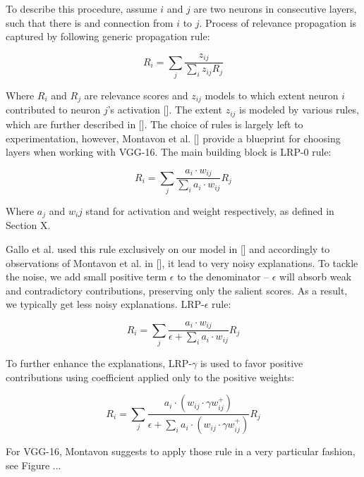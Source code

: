To describe this procedure, assume $i$ and $j$ are two neurons in consecutive layers, such that there is and connection from $i$ to $j$. Process of relevance propagation is captured by following generic propagation rule:

\begin{equation}
    R_i = \sum_j \frac{z_{ij}}{\sum_i z_{ij} R_j}
\end{equation}

Where $R_i$ and $R_j$ are relevance scores and $z_{ij}$ models to which extent neuron $i$ contributed to neuron $j$'s activation []. The extent $z_{ij}$ is modeled by various rules, which are further described in []. The choice of rules is largely left to experimentation, however, Montavon et al. [] provide a blueprint for choosing layers when working with VGG-16. The main building block is LRP-$0$ rule:

\begin{equation}
    R_i = \sum_j \frac{a_i \cdot w_{ij}}{\sum_i a_i \cdot w_{ij}} R_j
\end{equation}

Where $a_j$ and $w_ij$ stand for activation and weight respectively, as defined in Section X.

Gallo et al. used this rule exclusively on our model in [] and accordingly to observations of Montavon et al. in [], it lead to very noisy explanations. To tackle the noise, we add small positive term $\epsilon$ to the denominator -- $\epsilon$ will absorb weak and contradictory contributions, preserving only the salient scores. As a result, we typically get less noisy explanations. LRP-$\epsilon$ rule:

\begin{equation}
    R_i = \sum_j \frac{a_i \cdot w_{ij}}{\epsilon + \sum_i a_i \cdot w_{ij}} R_j
\end{equation}

To further enhance the explanations, LRP-$\gamma$ is used to favor positive contributions using coefficient applied only to the positive weights:

\begin{equation}
    R_i = \sum_j \frac{a_i \cdot (w_{ij} \cdot \gamma w_{ij}^+)}{\epsilon + \sum_i a_i \cdot (w_{ij} \cdot \gamma w_{ij}^+)} R_j
\end{equation}

For VGG-16, Montavon suggests to apply those rule in a very particular fashion, see Figure ...


